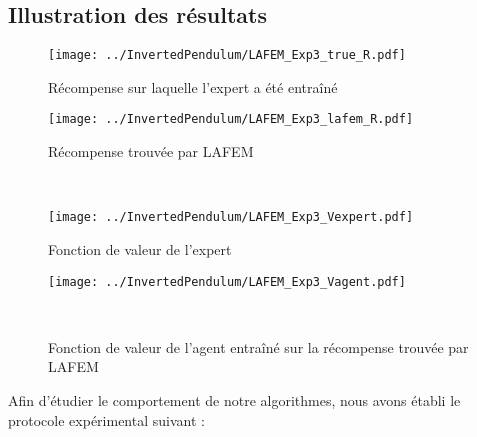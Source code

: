 \documentclass[publibook-draft]{CAp2012}
\begin{document}
\subsection{Illustration des résultats}
\begin{figure}
  \begin{minipage}[t]{.4\linewidth}
    \begin{center}
       \texttt{[image: ../InvertedPendulum/LAFEM\_Exp3\_true\_R.pdf]}
       \caption{Récompense sur laquelle l'expert a été entraîné}
       \label{trueR.fig}
    \end{center}
\end{minipage}
\hfill
\begin{minipage}[t]{.4\linewidth}
    \begin{center}
       \texttt{[image: ../InvertedPendulum/LAFEM\_Exp3\_lafem\_R.pdf]}
       \caption{Récompense trouvée par LAFEM}
       \label{lafemR.fig}
    \end{center}
\end{minipage}\\
\begin{minipage}[t]{.4\linewidth}
    \begin{center}
       \texttt{[image: ../InvertedPendulum/LAFEM\_Exp3\_Vexpert.pdf]}
       \caption{Fonction de valeur de l'expert}
       \label{trueV.fig}
    \end{center}
\end{minipage}
\hfill
\begin{minipage}[t]{.4\linewidth}
    \begin{center}
       \texttt{[image: ../InvertedPendulum/LAFEM\_Exp3\_Vagent.pdf]}
       \caption{Fonction de valeur de l'agent entraîné sur la récompense trouvée par LAFEM}
       \label{lafemV.fig}
    \end{center}
\end{minipage}\\
\end{figure}
Afin d'étudier le comportement de notre algorithmes, nous avons établi le protocole expérimental suivant :
\end{document}

